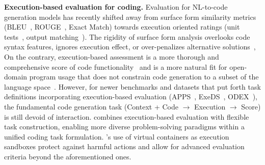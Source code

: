 \textbf{Execution-based evaluation for coding.} Evaluation for NL-to-code generation models has recently shifted away from surface form similarity metrics (BLEU~\cite{Papineni2002BleuAM, Agashe2019JuICeAL}, ROUGE~\cite{lin-2004-rouge}, Exact Match) towards execution oriented ratings (unit tests~\cite{austin2021program, chen2021evaluating, huang-etal-2022-execution, Lai2022DS1000, hendrycksapps2021}, output matching~\cite{dong2016language, huang-etal-2022-execution, zhong2017seq2sql}).
The rigidity of surface form analysis overlooks code syntax features, ignores execution effect, or over-penalizes alternative solutions~\cite{zhou2023codebertscore},
On the contrary, execution-based assessment is a more thorough and comprehensive score of code functionality~\cite{hendrycksapps2021} and is a more natural fit for open-domain program usage that does not constrain code generation to a subset of the language space~\cite{wang2023executionbased}.
However, for newer benchmarks and datasets that put forth task definitions incorporating execution-based evaluation (APPS~\cite{hendrycksapps2021}, ExeDS~\cite{huang-etal-2022-execution},  ODEX~\cite{wang2023executionbased}), the fundamental code generation task (Context + Code $\rightarrow$ Execution $\rightarrow$ Score) is still devoid of interaction.
\benchmark{} combines execution-based evaluation with flexible task construction, enabling more diverse problem-solving paradigms within a unified coding task formulation.
\benchmark{}'s use of virtual containers as execution sandboxes protect against harmful actions and allow for advanced evaluation criteria beyond the aforementioned ones.

